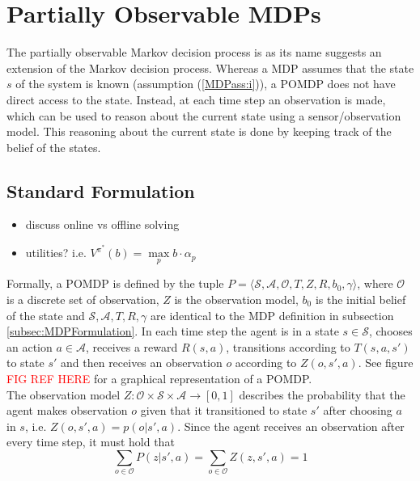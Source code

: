 \section{Partially Observable MDPs}\label{sec:POMDP}
The partially observable Markov decision process is as its name suggests an extension of the Markov decision process. Whereas a MDP assumes that the state $s$ of the system is known (assumption (\ref{MDPass:i})), a POMDP does not have direct access to the state. Instead, at each time step an observation is made, which can be used to reason about the current state using a sensor/observation model. This reasoning about the current state is done by keeping track of the belief of the states.
\subsection{Standard Formulation}
\begin{itemize}
    \item discuss online vs offline solving
    \item utilities? i.e. $V^{\pi^*}(b)=\underset{p}{\max }b\cdot \alpha_p$
\end{itemize}


Formally, a POMDP is defined by the tuple $P = \langle \mathcal{S}, \mathcal{A}, \mathcal{O}, T, Z, R, b_0, \gamma \rangle$, where $\mathcal{O}$ is a discrete set of observation, $Z$ is the observation model, $b_0$ is the initial belief of the state and $\mathcal{S}, \mathcal{A}, T, R, \gamma$ are identical to the MDP definition in subsection \ref{subsec:MDPFormulation}. In each time step the agent is in a state $s\in\mathcal{S}$, chooses an action $a\in\mathcal{A}$, receives a reward $R(s,a)$, transitions according to $T(s,a,s')$ to state $s'$ and then receives an observation $o$ according to $Z(o, s', a)$. See figure \textcolor{red}{FIG REF HERE} for a graphical representation of a POMDP.\\ The observation model $Z:\mathcal{O}\times\mathcal{S}\times\mathcal{A}\rightarrow [0, 1]$ describes the probability that the agent makes observation $o$ given that it transitioned to state $s'$ after choosing $a$ in $s$, i.e. $Z(o,s',a) = p(o|s',a)$. Since the agent receives an observation after every time step, it must hold that 
\begin{equation}
    \sum_{o\in\mathcal{O}}P(z|s',a) = \sum_{o\in\mathcal{O}}Z(z,s', a) = 1
\end{equation}

